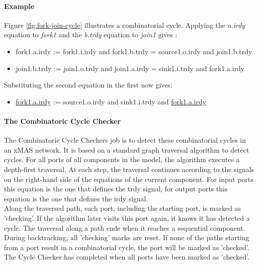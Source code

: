 \documentclass[a4paper,11pt]{article}
\begin{document}
\paragraph{Example}
Figure \ref{fig:fork-join-cycle} illustrates a combinatorial cycle. Applying the \emph{a.irdy} equation
to \emph{fork1} and the \emph{b.trdy} equation to \emph{join1} gives \cite[p.~44]{chatterjee10}:
\begin{itemize}
 \item fork1.a.irdy := fork1.i.irdy and fork1.b.trdy = source1.o.irdy and join1.b.trdy
 \item join1.b.trdy := join1.o.trdy and join1.a.irdy = sink1.i.trdy and fork1.a.irdy
\end{itemize}
Substituting the second equation in the first now gives:
\begin{itemize}
 \item \underline{fork1.a.irdy} := source1.o.irdy and sink1.i.trdy and \underline{fork1.a.irdy}
\end{itemize}







\paragraph{The Combinatoric Cycle Checker}
The Combinatoric Cycle Checkers job is to detect these combinatorial cycles in an xMAS network.
It is based on a standard graph traversal algorithm to detect cycles. For all ports of all
components in the model, the algorithm executes a depth-first traversal. At each step, the
traversal continues according to the signals on the right-hand side of the equations
of the current component. For input ports this equation is the one that defines
the trdy signal, for output ports this equation is the one that defines the irdy signal.\\
Along the traversed path, each port, including the starting port, is marked as 'checking'.
If the algorithm later visits this port again, it knows it has detected a cycle.
The traversal along a path ends when it reaches a sequential component. During backtracking,
all 'checking' marks are reset. If none of the paths starting from a port result in a
combinatorial cycle, the port will be marked as 'checked'. The Cycle Checker has completed
when all ports have been marked as 'checked'.
\end{document}
